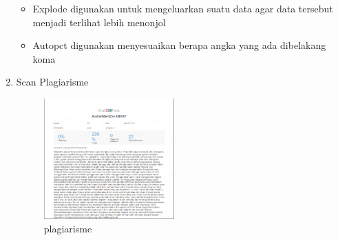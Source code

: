 \begin{enumerate}
\begin{itemize}
    \item Explode digunakan untuk mengeluarkan suatu data agar data tersebut menjadi terlihat lebih menonjol
    \item Autopct digunakan menyesuaikan berapa angka yang ada dibelakang koma
    \end{itemize}
    \item Scan Plagiarisme
    \begin{figure}[ht!]
    \includegraphics[width=5cm]{figures/6/1174084/Teori/c6_1.png}
    \centering
    \caption{plagiarisme}
    \end{figure}
    
\end{enumerate}
